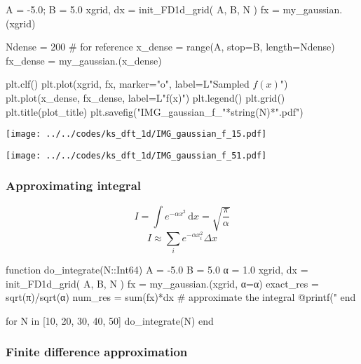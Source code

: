 \begin{frame}[fragile]

\begin{juliacode}
A = -5.0; B =  5.0
xgrid, dx = init_FD1d_grid( A, B, N )
fx = my_gaussian.(xgrid)

Ndense = 200 # for reference
x_dense = range(A, stop=B, length=Ndense)
fx_dense = my_gaussian.(x_dense)

plt.clf()
plt.plot(xgrid, fx, marker="o", label=L"Sampled $f(x)$")
plt.plot(x_dense, fx_dense, label=L"f(x)")
plt.legend()
plt.grid()
plt.title(plot_title)
plt.savefig("IMG_gaussian_f_"*string(N)*".pdf")
\end{juliacode}

\end{frame}


\begin{frame}

{\centering
\texttt{[image: ../../codes/ks\_dft\_1d/IMG\_gaussian\_f\_15.pdf]}
\par}

\end{frame}


\begin{frame}

{\centering
\texttt{[image: ../../codes/ks\_dft\_1d/IMG\_gaussian\_f\_51.pdf]}
\par}

\end{frame}


\begin{frame}[fragile]
\frametitle{Approximating integral}

\begin{equation*}
I = \int e^{-\alpha x^2}\, \mathrm{d}x = \sqrt{ \frac{\pi}{\alpha} }
\end{equation*}
\begin{equation*}
I \approx \sum_{i} e^{-\alpha x_{i}^2} \Delta x
\end{equation*}

\begin{juliacode}
function do_integrate(N::Int64)
    A = -5.0
    B = 5.0
    α = 1.0
    xgrid, dx = init_FD1d_grid( A, B, N )
    fx = my_gaussian.(xgrid, α=α)
    exact_res = sqrt(π)/sqrt(α)
    num_res = sum(fx)*dx # approximate the integral
    @printf("%
end

for N in [10, 20, 30, 40, 50]
    do_integrate(N)
end
\end{juliacode}

\end{frame}



\begin{frame}
\frametitle{Finite difference approximation}


\end{frame}





